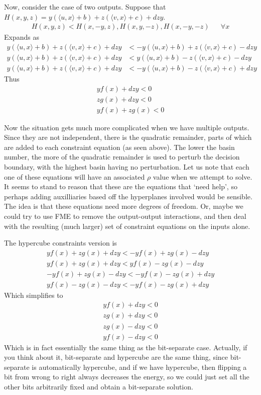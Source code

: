 \documentclass{article}
\begin{document}
Now, consider the case of two outputs. Suppose that $H(x,y,z) = y(\langle u, x\rangle + b) + z(\langle v, x\rangle + c) + dzy$. 
\begin{align}
	H(x,y,z) < H(x,-y,z), H(x,y,-z), H(x,-y,-z) &&\forall x
\end{align}
Expands as 
\begin{align}
	y(\langle u, x\rangle + b) + z(\langle v, x\rangle + c) + dzy &< -y(\langle u, x\rangle + b) + z(\langle v, x\rangle + c) - dzy\\
	y(\langle u, x\rangle + b) + z(\langle v, x\rangle + c) + dzy &< y(\langle u, x\rangle + b) - z(\langle v, x\rangle + c) - dzy\\
	y(\langle u, x\rangle + b) + z(\langle v, x\rangle + c) + dzy &< -y(\langle u, x\rangle + b) - z(\langle v, x\rangle + c) + dzy
\end{align}
Thus
\begin{align}
	yf(x) + dzy < 0\\
	zg(x) + dzy < 0\\
	yf(x) + zg(x) < 0
\end{align}

Now the situation gets much more complicated when we have multiple outputs. Since they are not independent, there is the quadratic remainder, parts of which are added to each constraint equation (as seen above). The lower the basin number, the more of the quadratic remainder is used to perturb the decision boundary, with the highest basin having no perturbation. Let us note that each one of these equations will have an associated $\rho$ value when we attempt to solve. It seems to stand to reason that these are the equations that `need help', so perhaps adding auxilliaries based off the hyperplanes involved would be sensible. The idea is that these equations need more degrees of freedom. Or, maybe we could try to use FME to remove the output-output interactions, and then deal with the resulting (much larger) set of constraint equations on the inputs alone. 

The hypercube constraints version is 
\begin{align}
	yf(x) + zg(x) + dzy < -yf(x) + zg(x) - dzy\\
	yf(x) + zg(x) + dzy < yf(x) - zg(x) - dzy\\
	-yf(x) + zg(x) - dzy < -yf(x) - zg(x) + dzy\\
	yf(x) - zg(x) - dzy < -yf(x) - zg(x) + dzy
\end{align}
Which simplifies to
\begin{align}
	yf(x) + dzy < 0\\
	zg(x) + dzy < 0\\
	zg(x) - dzy < 0\\
	yf(x) - dzy < 0
\end{align}
Which is in fact essentially the same thing as the bit-separate case. Actually, if you think about it, bit-separate and hypercube are the same thing, since bit-separate is automatically hypercube, and if we have hypercube, then flipping a bit from wrong to right always decreases the energy, so we could just set all the other bits arbitrarily fixed and obtain a bit-separate solution.
\end{document}
